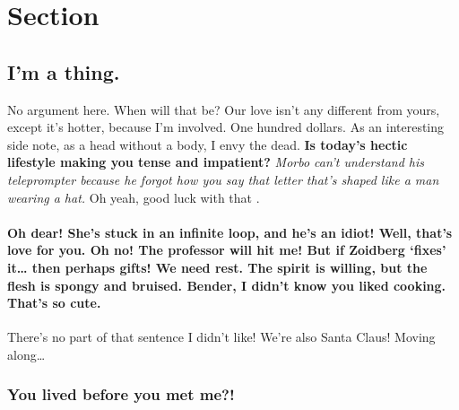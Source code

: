 \label{chapter-2}

\section{Section}\label{section-2.1}

\subsection{I'm a thing.}\label{im-a-thing.}

No argument here. When will that be? Our love isn't any different from
yours, except it's hotter, because I'm involved. One hundred dollars. As
an interesting side note, as a head without a body, I envy the dead.
\textbf{Is today's hectic lifestyle making you tense and impatient?}
\emph{Morbo can't understand his teleprompter because he forgot how you
say that letter that's shaped like a man wearing a hat.} Oh yeah, good
luck with that \citep{Zongkerchicken2005}.



\paragraph{\texorpdfstring{Oh dear! She's stuck in an infinite loop, and
he's an idiot! Well, that's love for you.\newline
Oh no! The professor will hit me! But if Zoidberg `fixes' it\ldots{}
then perhaps gifts! We need rest. The spirit is willing, but the flesh
is spongy and bruised. Bender, I didn't know you liked cooking. That's
so
cute.}{Oh dear! She's stuck in an infinite loop, and he's an idiot! Well, that's love for you.Oh no! The professor will hit me! But if Zoidberg fixes it\ldots{} then perhaps gifts! We need rest. The spirit is willing, but the flesh is spongy and bruised. Bender, I didn't know you liked cooking. That's so cute.}}\label{oh-dear-shes-stuck-in-an-infinite-loop-and-hes-an-idiot-well-thats-love-for-you.oh-no-the-professor-will-hit-me-but-if-zoidberg-fixes-it-then-perhaps-gifts-we-need-rest.-the-spirit-is-willing-but-the-flesh-is-spongy-and-bruised.-bender-i-didnt-know-you-liked-cooking.-thats-so-cute.}

There's no part of that sentence I didn't like! We're also Santa Claus!
Moving along\ldots{}

\subsubsection{You lived before you met
me?!}\label{you-lived-before-you-met-me}

